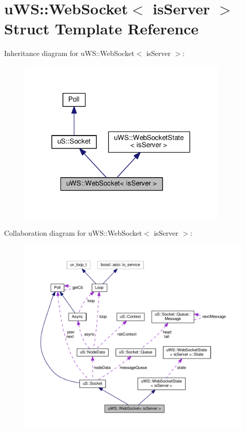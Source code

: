 \hypertarget{structu_w_s_1_1_web_socket}{}\section{u\+WS\+:\+:Web\+Socket$<$ is\+Server $>$ Struct Template Reference}
\label{structu_w_s_1_1_web_socket}


Inheritance diagram for u\+WS\+:\+:Web\+Socket$<$ is\+Server $>$\+:
\nopagebreak
\begin{figure}[H]
\begin{center}
\leavevmode
\includegraphics[width=282pt]{structu_w_s_1_1_web_socket__inherit__graph}
\end{center}
\end{figure}


Collaboration diagram for u\+WS\+:\+:Web\+Socket$<$ is\+Server $>$\+:
\nopagebreak
\begin{figure}[H]
\begin{center}
\leavevmode
\includegraphics[width=350pt]{structu_w_s_1_1_web_socket__coll__graph}
\end{center}
\end{figure}
